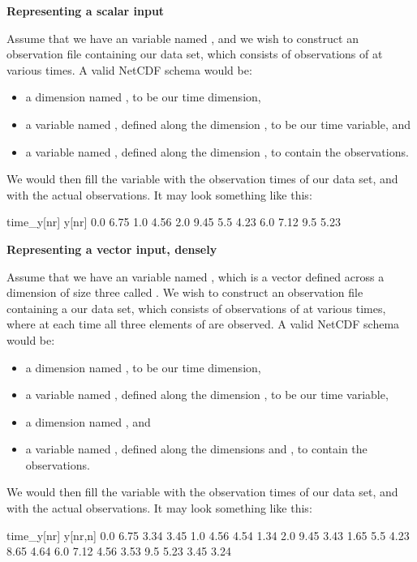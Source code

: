 \begin{example}
\noindent \textbf{Representing a scalar input}

Assume that we have an  variable named , and we wish to
construct an observation file containing our data set, which consists of
observations of  at various times. A valid NetCDF schema would be:
\begin{itemize}
\item a dimension named , to be our time dimension,
\item a variable named , defined along the dimension ,
  to be our time variable, and
\item a variable named , defined along the dimension , to
  contain the observations.
\end{itemize}
We would then fill the variable  with the observation times of
our data set, and  with the actual observations. It may look something
like this:

\begin{cmdcode}
time_y[nr]    y[nr]
       0.0     6.75
       1.0     4.56
       2.0     9.45
       5.5     4.23
       6.0     7.12
       9.5     5.23
\end{cmdcode}

\end{example}

\begin{example}
\noindent \textbf{Representing a vector input, densely}

Assume that we have an  variable named , which is a vector
defined across a dimension of size three called . We wish to construct
an observation file containing a our data set, which consists of observations
of  at various times, where at each time all three elements of
 are observed. A valid NetCDF schema would be:
\begin{itemize}
\item a dimension named , to be our time dimension,
\item a variable named , defined along the dimension ,
  to be our time variable,
\item a dimension named , and
\item a variable named , defined along the dimensions  and
  , to contain the observations.
\end{itemize}
We would then fill the variable  with the observation times of
our data set, and  with the actual observations. It may look something
like this:

\begin{cmdcode}
time_y[nr]            y[nr,n]
       0.0     6.75 3.34 3.45
       1.0     4.56 4.54 1.34
       2.0     9.45 3.43 1.65
       5.5     4.23 8.65 4.64
       6.0     7.12 4.56 3.53
       9.5     5.23 3.45 3.24
\end{cmdcode}

\end{example}


